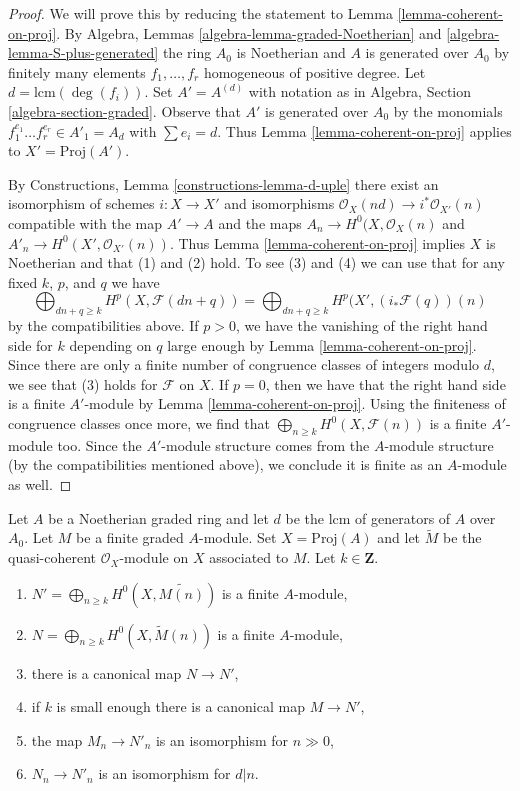 \begin{proof}
We will prove this by reducing the statement to
Lemma \ref{lemma-coherent-on-proj}.
By Algebra, Lemmas \ref{algebra-lemma-graded-Noetherian} and
\ref{algebra-lemma-S-plus-generated} the ring $A_0$ is Noetherian
and $A$ is generated over $A_0$ by finitely many elements
$f_1, \ldots, f_r$ homogeneous of positive degree.
Let $d = \text{lcm}(\deg(f_i))$. Set $A' = A^{(d)}$ with notation
as in Algebra, Section \ref{algebra-section-graded}.
Observe that $A'$ is generated over $A_0$ by the monomials
$f_1^{e_1} \ldots f_r^{e_r} \in A'_1 = A_d$ with $\sum e_i = d$.
Thus Lemma \ref{lemma-coherent-on-proj} applies to $X' = \text{Proj}(A')$.

\medskip\noindent
By Constructions, Lemma \ref{constructions-lemma-d-uple} there exist
an isomorphism of schemes $i : X \to X'$ and
isomorphisms $\mathcal{O}_X(nd) \to i^*\mathcal{O}_{X'}(n)$
compatible with the map $A' \to A$ and the maps
$A_n \to H^0(X, \mathcal{O}_X(n)$ and $A'_n \to H^0(X', \mathcal{O}_{X'}(n))$.
Thus Lemma \ref{lemma-coherent-on-proj} implies $X$ is Noetherian and that
(1) and (2) hold. To see (3) and (4)
we can use that for any fixed $k$, $p$, and $q$ we have
$$
\bigoplus\nolimits_{dn + q \geq k} H^p(X, \mathcal{F}(dn + q)) =
\bigoplus\nolimits_{dn + q \geq k} H^p(X', (i_*\mathcal{F}(q))(n)
$$
by the compatibilities above. If $p > 0$, we have the vanishing of the right
hand side for $k$ depending on $q$ large enough by
Lemma \ref{lemma-coherent-on-proj}. Since there are only a finite number
of congruence classes of integers modulo $d$, we see that (3) holds for
$\mathcal{F}$ on $X$. If $p = 0$, then we have that the right hand side
is a finite $A'$-module by Lemma \ref{lemma-coherent-on-proj}. Using
the finiteness of congruence classes once more, we find that
$\bigoplus_{n \geq k} H^0(X, \mathcal{F}(n))$ is a finite $A'$-module too.
Since the $A'$-module structure comes from the $A$-module structure
(by the compatibilities mentioned above), we conclude it is finite
as an $A$-module as well.
\end{proof}

\begin{lemma}
\label{lemma-recover-tail-graded-module-general}
Let $A$ be a Noetherian graded ring and let $d$ be the lcm of generators
of $A$ over $A_0$. Let $M$ be a finite graded $A$-module.
Set $X = \text{Proj}(A)$ and let $\widetilde{M}$ be
the quasi-coherent $\mathcal{O}_X$-module on $X$ associated to $M$.
Let $k \in \mathbf{Z}$.
\begin{enumerate}
\item $N' = \bigoplus_{n \geq k} H^0(X, \widetilde{M(n)})$
is a finite $A$-module,
\item $N = \bigoplus_{n \geq k} H^0(X, \widetilde{M}(n))$
is a finite $A$-module,
\item there is a canonical map $N \to N'$,
\item if $k$ is small enough there is a canonical map $M \to N'$,
\item the map $M_n \to N'_n$ is an isomorphism for $n \gg 0$,
\item $N_n \to N'_n$ is an isomorphism for $d | n$.
\end{enumerate}
\end{lemma}

